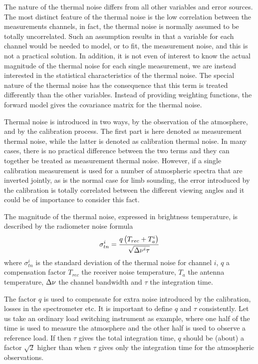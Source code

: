  \label{sec:measerr:tn}
 
 The nature of the thermal noise differs from all other variables and
 error sources. The most distinct feature of the thermal noise is the
 low correlation between the measurements channels, in fact, the
 thermal noise is normally assumed to be totally uncorrelated. Such an
 assumption results in that a variable for each channel would be
 needed to model, or to fit, the measurement noise, and this is not a
 practical solution. In addition, it is not even of interest to know
 the actual magnitude of the thermal noise for each single
 measurement, we are instead interested in the statistical
 characteristics of the thermal noise.  The special nature of the
 thermal noise has the consequence that this term is treated
 differently than the other variables. Instead of providing weighting
 functions, the forward model gives the covariance matrix for the
 thermal noise.
 
 Thermal noise is introduced in two ways, by the observation of the
 atmosphere, and by the calibration process. The first part is here
 denoted as measurement thermal noise, while the latter is denoted as
 calibration thermal noise. In many cases, there is no practical
 difference between the two terms and they can together be treated as
 measurement thermal noise. However, if a single calibration
 measurement is used for a number of atmospheric spectra that are
 inverted jointly, as is the normal case for limb sounding, the error
 introduced by the calibration is totally correlated between the
 different viewing angles and it could be of importance to consider
 this fact.
 
 The magnitude of the thermal noise, expressed in brightness
 temperature, is described by the radiometer noise formula
 \begin{equation}
   \sigma_{tn}^i = \frac{q\left(T_{rec}+T_a^i\right)}{\sqrt{\Delta \nu^i \tau}}
  \label{eq:measerr:tn}
 \end{equation}
 where $\sigma_{tn}^i$ is the standard deviation of the thermal noise
 for channel $i$, $q$ a compensation factor $T_{rec}$ the receiver
 noise temperature, $T_a$ the antenna temperature, $\Delta \nu$ the
 channel bandwidth and $\tau$ the integration time.
 
 The factor $q$ is used to compensate for extra noise introduced by
 the calibration, losses in the spectrometer etc. It is important to
 define $q$ and $\tau$ consistently. Let us take an ordinary load
 switching instrument as example, where one half of the time is used
 to measure the atmosphere and the other half is used to observe a
 reference load. If then $\tau$ gives the total integration time, $q$
 should be (about) a factor $\sqrt{2}$ higher than when $\tau$ gives
 only the integration time for the atmospheric observations.


